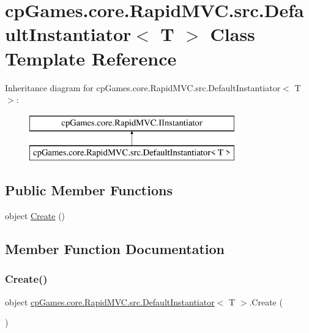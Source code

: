 \hypertarget{classcp_games_1_1core_1_1_rapid_m_v_c_1_1src_1_1_default_instantiator}{}\section{cp\+Games.\+core.\+Rapid\+M\+V\+C.\+src.\+Default\+Instantiator$<$ T $>$ Class Template Reference}
\label{classcp_games_1_1core_1_1_rapid_m_v_c_1_1src_1_1_default_instantiator}
Inheritance diagram for cp\+Games.\+core.\+Rapid\+M\+V\+C.\+src.\+Default\+Instantiator$<$ T $>$\+:\begin{figure}[H]
\begin{center}
\leavevmode
\includegraphics[height=2.000000cm]{classcp_games_1_1core_1_1_rapid_m_v_c_1_1src_1_1_default_instantiator}
\end{center}
\end{figure}
\subsection*{Public Member Functions}
\begin{DoxyCompactItemize}
\item 
object \mbox{\hyperlink{classcp_games_1_1core_1_1_rapid_m_v_c_1_1src_1_1_default_instantiator_a6379b00cf41f87d381e58e2afd0ac159}{Create}} ()
\end{DoxyCompactItemize}


\subsection{Member Function Documentation}
\mbox{\label{classcp_games_1_1core_1_1_rapid_m_v_c_1_1src_1_1_default_instantiator_a6379b00cf41f87d381e58e2afd0ac159}} 
\subsubsection{\texorpdfstring{Create()}{Create()}}
{\footnotesize\ttfamily object \mbox{\hyperlink{classcp_games_1_1core_1_1_rapid_m_v_c_1_1src_1_1_default_instantiator}{cp\+Games.\+core.\+Rapid\+M\+V\+C.\+src.\+Default\+Instantiator}}$<$ T $>$.Create (\begin{DoxyParamCaption}{ }\end{DoxyParamCaption})}



